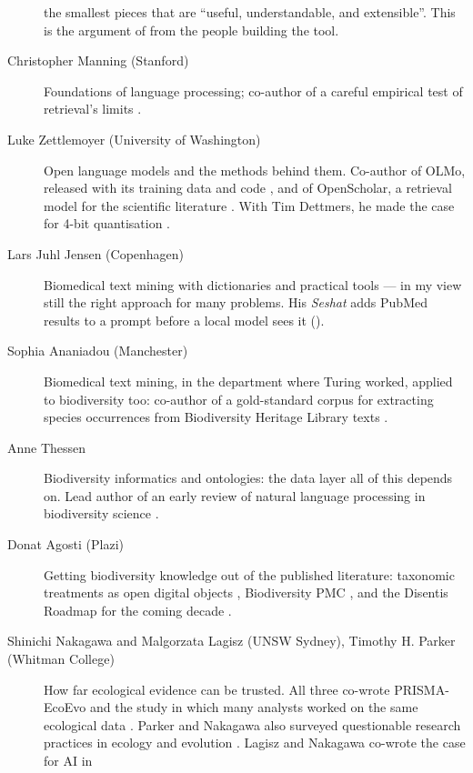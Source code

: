 \begin{description}
    the smallest pieces that are ``useful, understandable, and extensible''.
    This is the argument of  from the people building the
    tool.
  \item[Christopher Manning (Stanford)] Foundations of language processing;
    co-author of a careful empirical test of retrieval's limits
    \parencite{magesh2025legalrag}.
  \item[Luke Zettlemoyer (University of Washington)] Open language models and
    the methods behind them. Co-author of OLMo, released with its training data
    and code \parencite{groeneveld2024olmo}, and of OpenScholar, a retrieval
    model for the scientific literature \parencite{asai2026openscholar}. With
    Tim Dettmers, he made the case for 4-bit quantisation
    \parencite{dettmers2022fourbit}.
  \item[Lars Juhl Jensen (Copenhagen)] Biomedical text mining with dictionaries
    and practical tools --- in my view still the right approach for many
    problems. His \emph{Seshat} adds PubMed results to a prompt before a local
    model sees it ().
  \item[Sophia Ananiadou (Manchester)] Biomedical text mining, in the department
    where Turing worked, applied to biodiversity too: co-author of a gold-standard
    corpus for extracting species occurrences from Biodiversity Heritage Library
    texts
    \parencite{nguyen2019copious}.
  \item[Anne Thessen] Biodiversity informatics and ontologies: the data layer
    all of this depends on. Lead author of an early review of natural language
    processing in biodiversity science \parencite{thessen2012nlp}.
  \item[Donat Agosti (Plazi)] Getting biodiversity knowledge out of the
    published literature: taxonomic treatments as open digital objects
    \parencite{agosti2022treatments}, Biodiversity PMC
    \parencite{pasche2026biodivpmc}, and the Disentis Roadmap for the coming
    decade \parencite{agosti2026disentis}.
  \item[Shinichi Nakagawa and Malgorzata Lagisz (UNSW Sydney), Timothy H.
    Parker (Whitman College)] How far ecological evidence can be trusted. All
    three co-wrote PRISMA-EcoEvo \parencite{odea2021prismaecoevo} and the study
    in which many analysts worked on the same ecological data
    \parencite{gould2025analysts}. Parker and Nakagawa also surveyed
    questionable research practices in ecology and evolution
    \parencite{fraser2018qrp}. Lagisz and Nakagawa co-wrote the case for AI in

\end{description}
